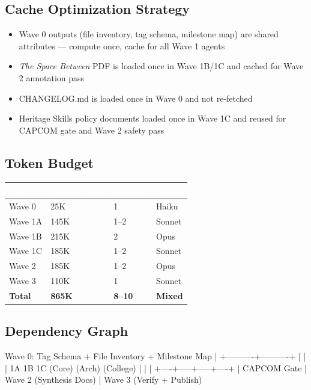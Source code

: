 \documentclass[11pt,letterpaper]{article}
\newcommand{\tableheader}[1]{\textbf{\sffamily\textcolor{white}{#1}}}
\begin{document}
\subsection{Cache Optimization Strategy}

\begin{itemize}[noitemsep]
  \item Wave 0 outputs (file inventory, tag schema, milestone map) are shared attributes --- compute once, cache for all Wave 1 agents
  \item \textit{The Space Between} PDF is loaded once in Wave 1B/1C and cached for Wave 2 annotation pass
  \item CHANGELOG.md is loaded once in Wave 0 and not re-fetched
  \item Heritage Skills policy documents loaded once in Wave 1C and reused for CAPCOM gate and Wave 2 safety pass
\end{itemize}

\subsection{Token Budget}

\begin{center}
\begin{tabularx}{\textwidth}{L{4cm}C{2.5cm}C{2.5cm}C{2.5cm}}
\toprule
{}
\tableheader{Wave} & \tableheader{Tokens (est.)} & \tableheader{Sessions} & \tableheader{Model} \\
\midrule
Wave 0 & 25K & 1 & Haiku \\
Wave 1A & 145K & 1--2 & Sonnet \\
Wave 1B & 215K & 2 & Opus \\
Wave 1C & 185K & 1--2 & Sonnet \\
Wave 2 & 185K & 1--2 & Opus \\
Wave 3 & 110K & 1 & Sonnet \\
\midrule
\textbf{Total} & \textbf{865K} & \textbf{8--10} & \textbf{Mixed} \\
\bottomrule
\end{tabularx}
\end{center}

\subsection{Dependency Graph}

\begin{asciibox}
Wave 0: Tag Schema + File Inventory + Milestone Map
  |
  +----------+----------+
  |          |          |
 1A         1B         1C
(Core)    (Arch)    (College)
  |          |          |
  +----+-----+-----+----+
            |
       CAPCOM Gate
            |
         Wave 2
      (Synthesis Docs)
            |
         Wave 3
      (Verify + Publish)
\end{asciibox}
\end{document}
